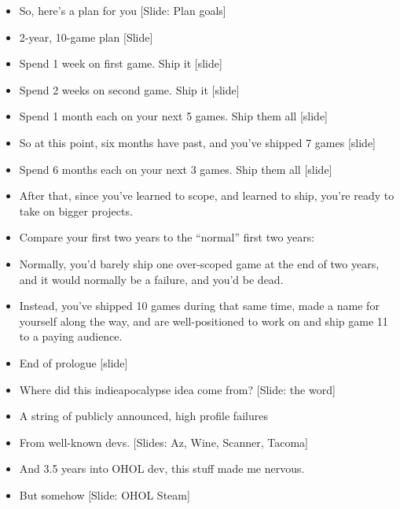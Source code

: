 \documentclass[12pt]{article}
\begin{document}
{\begin{itemize}
\item So, here's a plan for you [Slide:  Plan goals]

\item 2-year, 10-game plan [Slide]

\item Spend 1 week on first game. Ship it [slide]

\item Spend 2 weeks on second game.  Ship it [slide]

\item Spend 1 month each on your next 5 games.  Ship them all [slide]

\item So at this point, six months have past, and you've shipped 7 games [slide]

\item Spend 6 months each on your next 3 games.  Ship them all [slide]

\item After that, since you've learned to scope, and learned to ship, you're ready to take on bigger projects.

\item Compare your first two years to the ``normal'' first two years:

\item Normally, you'd barely ship one over-scoped game at the end of two years, and it would normally be a failure, and you'd be dead.

\item Instead, you've shipped 10 games during that same time, made a name for yourself along the way, and are well-positioned to work on and ship game 11 to a paying audience.

\item End of prologue [slide]

\item Where did this indieapocalypse idea come from? [Slide: the word]

\item A string of publicly announced, high profile failures

\item From well-known devs.  [Slides:  Az, Wine, Scanner, Tacoma]

\item And 3.5 years into OHOL dev, this stuff made me nervous.

\item But somehow [Slide:  OHOL Steam]


\end{itemize}}
\end{document}
